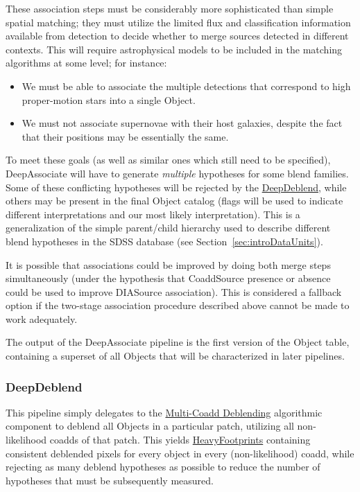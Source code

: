 These association steps must be considerably more sophisticated than simple spatial matching; they must utilize the limited flux and classification information available from detection to decide whether to merge sources detected in different contexts.  This will require astrophysical models to be included in the matching algorithms at some level; for instance:
\begin{itemize}
\item We must be able to associate the multiple detections that correspond to high proper-motion stars into a single Object.
\item We must not associate supernovae with their host galaxies, despite the fact that their positions may be essentially the same.
\end{itemize}
To meet these goals (as well as similar ones which still need to be specified), DeepAssociate will have to generate \emph{multiple} hypotheses for some blend families.  Some of these conflicting hypotheses will be rejected by the \hyperref[sec:drpDeepDeblend]{DeepDeblend}, while others may be present in the final Object catalog (flags will be used to indicate different interpretations and our most likely interpretation).  This is a generalization of the simple parent/child hierarchy used to describe different blend hypotheses in the SDSS database (see Section~\ref{sec:introDataUnits}).

It is possible that associations could be improved by doing both merge steps simultaneously (under the hypothesis that CoaddSource presence or absence could be used to improve DIASource association).  This is considered a fallback option if the two-stage association procedure described above cannot be made to work adequately.

The output of the DeepAssociate pipeline is the first version of the Object table, containing a superset of all Objects that will be characterized in later pipelines.

\subsubsection{DeepDeblend}
\label{sec:drpDeepDeblend}

This pipeline simply delegates to the \hyperref[sec:acMultiCoaddDeblending]{Multi-Coadd Deblending} algorithmic component to deblend all Objects in a particular patch, utilizing all non-likelihood coadds of that patch.  This yields \hyperref[sec:spFootprintsHeavy]{HeavyFootprints} containing consistent deblended pixels for every object in every (non-likelihood) coadd, while rejecting as many deblend hypotheses as possible to reduce the number of hypotheses that must be subsequently measured.

